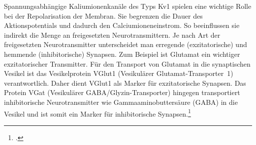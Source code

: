 Spannungsabhängige Kaliumionenkanäle des Typs Kv1 spielen eine wichtige
Rolle bei der Repolarisation der Membran. Sie begrenzen die
Dauer des Aktionspotentials und dadurch den Calciumioneneinstrom. So
beeinflussen sie indirekt die Menge an freigesetzten Neurotransmittern.
Je nach Art der freigesetzten Neurotransmitter unterscheidet man
erregende (exzitatorische) und hemmende (inhibitorische) Synapsen. Zum Beispiel ist Glutamat ein wichtiger
exzitatorischer Transmitter. Für den Transport von Glutamat
in die synaptischen Vesikel ist das Vesikelprotein VGlut1 (Vesikulärer
Glutamat-Transporter~1) verantwortlich. Daher dient VGlut1 als Marker
für exzitatorische Synapsen. Das Protein VGat (Vesikulärer
GABA/Glyzin-Transporter) hingegen transportiert inhibitorische
Neurotransmitter wie Gammaaminobuttersäure (GABA) in die Vesikel und ist
somit ein Marker für inhibitorische
Synapsen.\footcite[S.~1092]{Markl1997}

\clearpage